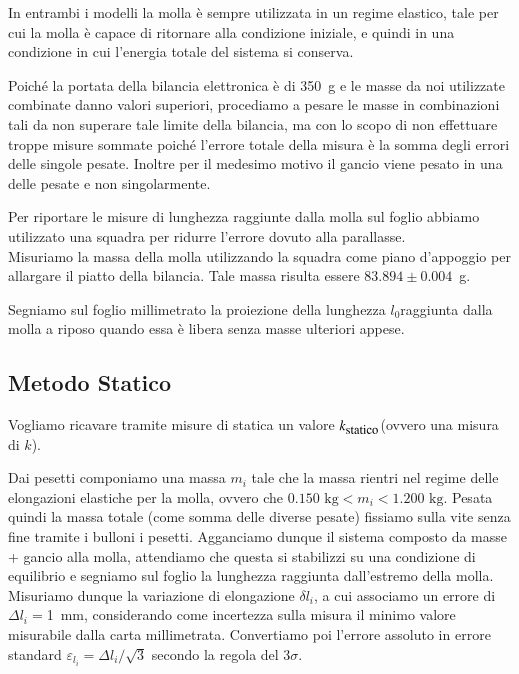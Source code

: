 \documentclass[italian, a4paper, 10pt, twocolumn]{../../style/lab_unige}
\newcommand{\ks}{$k_{\text{\small statico}}$\space}
\newcommand{\treSigma}{$3\sigma$\space}
\newcommand{\Lo}{$l_0$\space}
\newcommand{\MassI}[1]{$m_{#1}$}
\begin{document}
    In entrambi i modelli la molla è sempre utilizzata in un regime elastico, tale per cui la molla è capace
    di ritornare alla condizione iniziale, e quindi in una condizione in cui l'energia totale del sistema si 
    conserva.

    Poiché la portata della bilancia elettronica è di 350~g e le masse da noi utilizzate combinate danno valori
    superiori, procediamo a pesare le masse in combinazioni tali da non superare tale limite della bilancia, 
    ma con lo scopo di non effettuare troppe misure sommate poiché l'errore totale della misura è la somma degli
    errori delle singole pesate. Inoltre per il medesimo motivo il gancio viene pesato in una delle pesate e 
    non singolarmente.

    Per riportare le misure di lunghezza raggiunte dalla molla sul foglio abbiamo utilizzato una squadra per 
    ridurre l'errore dovuto alla parallasse.\\

    Misuriamo la massa della molla utilizzando la squadra come piano d'appoggio per allargare il piatto della 
    bilancia. Tale massa risulta essere $83.894\pm0.004$~g.

    Segniamo sul foglio millimetrato la proiezione della lunghezza \Lo raggiunta dalla molla a riposo quando 
    essa è libera senza masse ulteriori appese. 

    \subsection{Metodo Statico}
    \label{subsec:methods_stat}
    Vogliamo ricavare tramite misure di statica un valore \ks (ovvero una misura di $k$).

    Dai pesetti componiamo una massa \MassI{i} tale che la massa rientri nel regime delle elongazioni elastiche 
    per la molla, ovvero che  $0.150 \text{ kg} < m_i < 1.200 \text{ kg}$. 
    Pesata quindi la massa totale (come somma delle diverse pesate) fissiamo sulla vite senza fine tramite i 
    bulloni i pesetti. Agganciamo dunque il sistema composto da masse + gancio alla molla, attendiamo che questa 
    si stabilizzi su una condizione di equilibrio e segniamo sul foglio la lunghezza raggiunta dall'estremo della 
    molla.
    Misuriamo dunque la variazione di elongazione $\delta l_i$, a cui associamo un errore di $\Delta l_i=$1~mm, 
    considerando come incertezza sulla misura il minimo valore misurabile dalla carta millimetrata. Convertiamo 
    poi l'errore assoluto in errore standard $\varepsilon_{l_i} = \Delta l_i /\sqrt{3}$ secondo la regola del 
    \treSigma.
    
\end{document}
